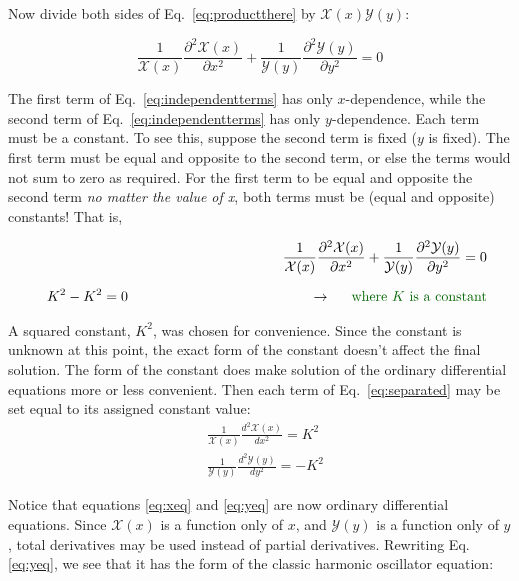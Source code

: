 \documentclass[12pt]{article}
\begin{document}
\begin{flushleft}
Now divide both sides of Eq.~\ref{eq:productthere} by $\mathcal{X}(x)\mathcal{Y}(y)$:

\begin{equation}
\frac{1}{\mathcal{X}(x)}\frac{\partial^{2} \mathcal{X}(x)}{\partial x^{2}} + \frac{1}{\mathcal{Y}(y)}\frac{\partial^{2} \mathcal{Y}(y)}{\partial y^{2}} = 0
\label{eq:independentterms}
\end{equation}

The first term of Eq.~\ref{eq:independentterms} has only $x$-dependence, while the second term of Eq.~\ref{eq:independentterms} has only $y$-dependence.  Each term must be a constant.  To see this, suppose the second term is fixed ($y$ is fixed).  The first term must be equal and opposite to the second term, or else the terms would not sum to zero as required.  For the first term to be equal and opposite the second term \textit{no matter the value of x}, both terms must be (equal and opposite) constants!  That is,

\begin{eqnarray}
& & \frac{1}{\mathcal{X}(x)}\frac{\partial^{2} \mathcal{X}(x)}{\partial x^{2}} + \frac{1}{\mathcal{Y}(y)}\frac{\partial^{2} \mathcal{Y}(y)}{\partial y^{2}} = 0  \label{eq:separated} \\[6pt]
& & K^{2} - K^{2} = 0 \hspace{1.8in} \rightarrow \hspace{.2in} \text{\color{mygreen} where $K$ is a constant} \nonumber
\end{eqnarray}

A squared constant, $K^{2}$, was chosen for convenience.  Since the constant is unknown at this point, the exact form of the constant doesn't affect the final solution.  The form of the constant does make solution of the ordinary differential equations more or less convenient.  Then each term of Eq.~\ref{eq:separated} may be set equal to its assigned constant value:
\begin{align}
& \frac{1}{\mathcal{X}(x)}\frac{d^{2} \mathcal{X}(x)}{dx^{2}} = K^{2} \label{eq:xeq} \\[6pt]
& \frac{1}{\mathcal{Y}(y)}\frac{d^{2} \mathcal{Y}(y)}{dy^{2}} = -K^{2} \label{eq:yeq}
\end{align}

Notice that equations \ref{eq:xeq} and \ref{eq:yeq} are now ordinary differential equations.  Since $\mathcal{X}(x)$ is a function only of $x$, and $\mathcal{Y}(y)$ is a function only of $y$, total derivatives may be used instead of partial derivatives.  Rewriting Eq.\ref{eq:yeq}, we see that it has the form of the classic harmonic oscillator equation:


\end{flushleft}
\end{document}
